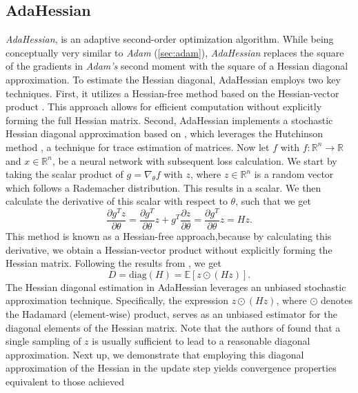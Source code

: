 \subsection{AdaHessian  \cite{yao2021adahessian}}
\label{sec:adahessian}
\emph{AdaHessian}, is an adaptive second-order optimization algorithm.
While being conceptually very similar to \emph{Adam} (\ref{sec:adam}), \emph{AdaHessian} replaces the square of the gradients
in \emph{Adam's} second moment with the square of a Hessian diagonal approximation.
To estimate the Hessian diagonal, AdaHessian employs two key techniques.
First, it utilizes a Hessian-free method based on the Hessian-vector product \cite{pearlmutter1994fast}.
This approach allows for efficient computation without explicitly forming the full Hessian matrix.
Second, AdaHessian implements a stochastic Hessian diagonal approximation based on \cite{BEKAS20071214},
which leverages the Hutchinson method \cite{hutchinson}, a technique for trace estimation of matrices.
Now let $f$ with $f: \mathbb{R}^n \to \mathbb{R}$ and $x \in \mathbb{R}^n$, be a neural network with subsequent
loss calculation. We start by taking the scalar product of $g=\nabla_\theta f$ with $z$, where
$z\in \mathbb{R}^n$ is a random vector which follows a Rademacher distribution. This results in a scalar.
We then calculate the derivative of this scalar with respect to $\theta$, such that we get
\begin{equation}
 \frac{\partial g^T z}{\partial \theta} = \frac{\partial g^T}{\partial \theta} z + g^T \frac{\partial z}{\partial \theta} = \frac{\partial g^T}{\partial \theta} z = Hz.
\end{equation}
This method is known as a Hessian-free approach,because by calculating this derivative, we obtain a Hessian-vector product without explicitly forming the Hessian matrix.
Following the results from  \cite{BEKAS20071214}, we get
\begin{equation}
    D = \text{diag}(H) = \mathbb{E}[z \odot (Hz)].
\end{equation}
The Hessian diagonal estimation in AdaHessian leverages an unbiased stochastic approximation technique.
Specifically, the expression $z \odot (Hz)$, where $\odot$ denotes the Hadamard (element-wise) product, serves as an unbiased estimator for the diagonal elements of the Hessian matrix.
Note that the authors of \cite{yao2021adahessian} found that a single sampling of $z$ is usually sufficient to lead to a reasonable diagonal approximation.
Next up, we demonstrate that employing this diagonal approximation of the Hessian in the update step yields convergence properties equivalent to those achieved
